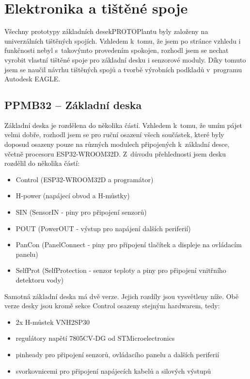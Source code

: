 \chapter{Elektronika a tištěné spoje}
Všechny prototypy základních desekPROTOPlantu byly založeny na univerzálních tištěných spojích. Vzhledem k~tomu, že jsem po stránce vzhledu i funkčnosti nebyl s~takovýmto provedením spokojen, rozhodl jsem se nechat vyrobit vlastní tištěné spoje pro základní desku i senzorové moduly.
Díky tomuto jsem se naučil návrhu tištěných spojů a tvorbě výrobních podkladů v~programu Autodesk EAGLE.

\section{PPMB32 -- Základní deska}
\label{subsec:motherBoard}
Základní deska je rozdělena do několika částí. 
Vzhledem k~tomu, že umím pájet velmi dobře, rozhodl jsem se pro ruční osazení všech součástek, které byly doposud osazeny pouze na různých modulech připojených k~základní desce, včetně procesoru ESP32-WROOM32D.
Z~důvodu přehlednosti jsem desku rozdělil do několika částí:

\begin{itemize}
    \item Control (ESP32-WROOM32D a programátor)
    \item H-power (napájecí obvod a H-můstky)
    \item SIN (SensorIN - piny pro připojení senzorů)
    \item POUT (PowerOUT - výstup pro napájení dalších periferií)
    \item PanCon (PanelConnect - piny pro připojení tlačítek a displeje na ovládacím panelu)
    \item SelfProt (SelfProtection - senzor teploty a piny pro připojení vnitřního detektoru vody)
\end{itemize} 

Samotná základní deska má dvě verze. Jejich rozdíly jsou vysvětleny níže.
Obě verze desky jsou kromě sekce Control osazeny stejným hardwarem, tedy:

\begin{itemize}
    \item 2x H-můstek VNH2SP30
    \item regulátory napětí 7805CV-DG od STMicroelectronics
    \item pinheady pro připojení senzorů, ovládacího panelu a dalších periferií
    \item svorkovnicemi pro připojení napájecích kabelů a silových výstupů
\end{itemize}

